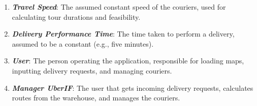 \documentclass{article}
\begin{document}
\begin{enumerate}
    \item \textbf{\textit{Travel Speed}}: The assumed constant speed of the couriers, used for calculating tour durations and feasibility.
    \item \textbf{\textit{Delivery Performance Time}}: The time taken to perform a delivery, assumed to be a constant (e.g., five minutes).
    \item \textbf{\textit{User}}: The person operating the application, responsible for loading maps, inputting delivery requests, and managing couriers.
    \item \textbf{\textit{Manager UberIF}}: The user that gets incoming delivery requests, calculates routes from the warehouse, and manages the couriers.
\end{enumerate}
\end{document}
